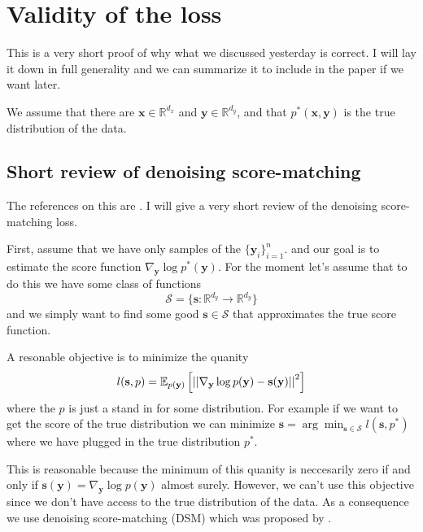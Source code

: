 \section{Validity of the loss}

This is a very short proof of why what we discussed yesterday is
correct. I will lay it down in full generality and we can summarize it
to include in the paper if we want later.


We assume that there are $\mathbf{x} \in \mathbb{R}^{d_x}$ and $\mathbf{y} \in \mathbb{R}^{d_y}$,
and that $p^*(\mathbf{x}, \mathbf{y})$ is the true distribution of the data.

\subsection{Short review of denoising score-matching}
\label{sec:denoising_score_matching}
The references on this are \cite{vincent2010connection,song2020generative}.
I will give a very short review of the denoising score-matching loss.

First, assume that we have only samples of the $\{ \mathbf{y}_i \}_{i=1}^n$.
and our goal is to estimate the score function $\nabla_{\mathbf{y}} \log p^*(\mathbf{y})$.
For the moment let's assume that to do this we have some class of functions
\[ \mathcal{S} = \{ \mathbf{s}: \mathbb{R}^{d_y} \to \mathbb{R}^{d_y} \} \]
and we simply want to find some good $\mathbf{s} \in \mathcal{S}$ that approximates the true score function.

A resonable objective is to minimize the quanity
\begin{align}
    \label{eq:score_matching}
 l(\mathbf{s}, p) = \mathbb{E}_{p(\mathbf{y})} \left[ \left|\left| \nabla_{\mathbf{y}} \log p(\mathbf{y}) - \mathbf{s}(\mathbf{y}) \right|\right|^2 \right]
\end{align}
where the $p$ is just a stand in for some distribution.
For example if we want to get the score of the true
distribution we can minimize $\mathbf{s} = \arg\min_{\mathbf{s} \in \mathcal{S}} l(\mathbf{s}, p^*)$
where we have plugged in the true distribution $p^*$.


This is reasonable because the minimum of this quanity is neccesarily zero if and only if
$\mathbf{s}(\mathbf{y}) = \nabla_{\mathbf{y}} \log p(\mathbf{y})$
almost surely.
However,  we can't use this objective since we don't have access to the true distribution of the data.
As a consequence we use denoising score-matching (DSM) which was proposed by \cite{vincent2010connection}.

